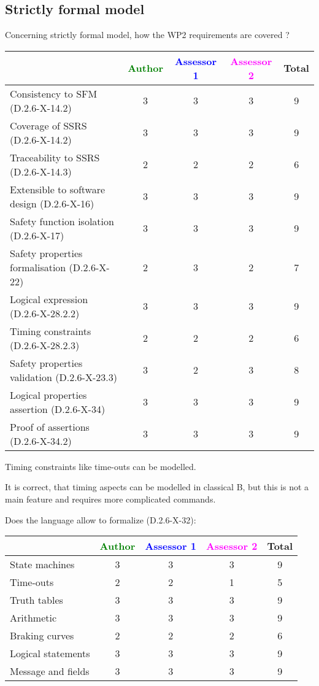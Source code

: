 \subsection{Strictly formal model}

Concerning strictly formal model, how the WP2 requirements are covered ?

\begin{tabular}{|l | c | c | c | c|}
\hline
& \textcolor{green}{Author} & \textcolor{blue}{Assessor 1} & \textcolor{magenta}{Assessor 2} & Total \\
\hline 
Consistency to SFM (D.2.6-X-14.2) & 3 & 3 & 3 & 9 \\
\hline
Coverage of SSRS (D.2.6-X-14.2)  & 3 & 3 & 3 & 9 \\
\hline
Traceability to  SSRS (D.2.6-X-14.3)  & 2 & 2 & 2 & 6 \\
\hline
Extensible to software design (D.2.6-X-16)  & 3 & 3 & 3 & 9 \\
\hline
Safety function isolation (D.2.6-X-17)  & 3 & 3 & 3 & 9 \\
\hline 
Safety properties formalisation (D.2.6-X-22)  & 2 & 3 & 2 & 7 \\
\hline
Logical expression (D.2.6-X-28.2.2)  & 3 & 3 & 3 & 9 \\
\hline
Timing constraints (D.2.6-X-28.2.3)  & 2 & 2 & 2 & 6 \\
\hline
Safety properties validation (D.2.6-X-23.3)  & 3 & 2 & 3 & 8 \\
\hline
Logical properties assertion (D.2.6-X-34)  & 3 & 3 & 3 & 9 \\
\hline
Proof of assertions (D.2.6-X-34.2)  & 3 & 3 & 3 & 9 \\
\hline
\end{tabular}



\begin{author_comment}
Timing constraints like time-outs can be modelled.
\end{author_comment}


\begin{assessor2}
It is correct, that timing aspects can be modelled in classical B, but this is not a main feature and requires more complicated commands.
\end{assessor2}

Does the language allow to  formalize (D.2.6-X-32):

\begin{tabular}{|l | c | c | c | c|}
\hline
& \textcolor{green}{Author} & \textcolor{blue}{Assessor 1} & \textcolor{magenta}{Assessor 2} & Total \\
\hline 
State machines  & 3 & 3 & 3 & 9 \\
\hline
Time-outs  & 2 & 2 & 1 & 5 \\
\hline
Truth tables  & 3 & 3 & 3 & 9 \\
\hline
Arithmetic  & 3 & 3 & 3 & 9 \\
\hline
Braking curves  & 2 & 2 & 2 & 6 \\
\hline
Logical statements & 3 & 3 & 3  & 9 \\
\hline
Message and fields & 3 & 3 & 3 & 9 \\
\hline
\end{tabular}


